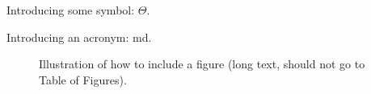 Introducing some symbol: $\Theta$.

Introducing an acronym: \gls{md}.

\begin{figure}[th!]
  \centering
  
  \caption[Short caption for Table of Figures]{Illustration of how to
  include a figure (long text, should not go to Table of Figures).}
  \label{fig:test}
\end{figure}

\cleardoublepage

